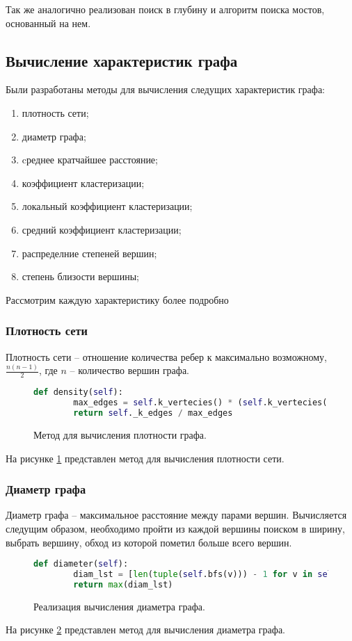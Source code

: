 Так же аналогично реализован поиск в глубину и алгоритм
поиска мостов, основанный на нем.
\subsection{Вычисление характеристик графа}
Были разработаны методы 
для вычисления следущих характеристик графа:
\begin{enumerate}
    \item плотность сети;
    \item диаметр графа;
    \item cреднее кратчайшее расстояние;
    \item коэффициент кластеризации;
    \item локальный коэффициент кластеризации;
    \item средний коэффициент кластеризации;
    \item распределние степеней вершин;
    \item степень близости вершины;
\end{enumerate}
Рассмотрим каждую характеристику более подробно
\subsubsection{Плотность сети}
Плотность сети -- отношение количества ребер к
максимально возможному, $\frac{n (n-1)}{2}$, где $n$ -- количество вершин графа.
\begin{figure}[H] 
\begin{lstlisting}[language=Python] 
    def density(self):
        max_edges = self.k_vertecies() * (self.k_vertecies() - 1) // 2
        return self._k_edges / max_edges
\end{lstlisting}  
    \caption{Метод для вычисления плотности графа.}
    \label{densg}
\end{figure} 
На рисунке \ref{densg} представлен метод 
для вычисления плотности сети.
\subsubsection{Диаметр графа}
Диаметр графа -- максимальное расстояние между парами вершин.
Вычисляется следущим образом, необходимо 
пройти из каждой вершины поиском в ширину, выбрать вершину,
обход из которой пометил больше всего вершин.
\begin{figure}[H] 
\begin{lstlisting}[language=Python] 
    def diameter(self):
        diam_lst = [len(tuple(self.bfs(v))) - 1 for v in self._vertecies]
        return max(diam_lst)
\end{lstlisting}  
    \caption{Реализация вычисления диаметра графа.}
    \label{grdiam}
\end{figure} 
На рисунке \ref{grdiam} представлен метод для вычисления диаметра графа.
